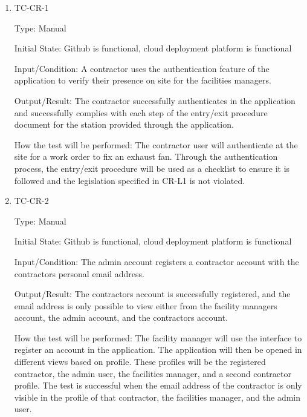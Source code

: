 \documentclass[12pt, titlepage]{article}
\begin{document}
\begin{enumerate}

  \item{TC-CR-1\\}

    Type: Manual

    Initial State: Github is functional, cloud deployment platform is functional

    Input/Condition: A contractor uses the authentication feature of
    the application
    to verify their presence on site for the facilities managers.

    Output/Result: The contractor successfully authenticates in the application
    and successfully complies with each step of the entry/exit
    procedure document
    for the station provided through the application.

    How the test will be performed: The contractor user will authenticate at the
    site for a work order to fix an exhaust fan. Through the
    authentication process,
    the entry/exit procedure will be used as a checklist to ensure it
    is followed
    and the legislation specified in CR-L1 is not violated.

  \item{TC-CR-2\\}

    Type: Manual

    Initial State: Github is functional, cloud deployment platform is functional

    Input/Condition: The admin account registers a contractor account with the
    contractors personal email address.

    Output/Result: The contractors account is successfully
    registered, and the email
    address is only possible to view either from the facility managers
    account, the admin
    account, and the contractors account.

    How the test will be performed: The facility manager will use the
    interface to
    register an account in the application. The application will then
    be opened in
    different views based on profile. These profiles will be the
    registered contractor,
    the admin user, the facilities manager, and a second contractor profile.
    The test is successful when the email address of the contractor is only
    visible in the profile of that contractor, the facilities manager,
    and the admin user.

\end{enumerate}
\end{document}
